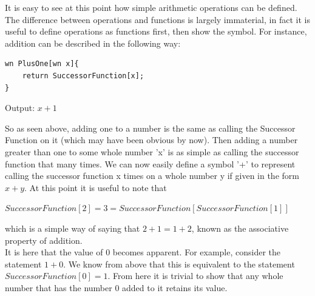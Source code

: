 It is easy to see at this point how simple arithmetic operations can be defined. The difference between operations and functions is largely immaterial, in fact it is useful to define operations as functions first, then show the symbol. For instance, addition can be described in the following way:
\begin{center}
\begin{verbatim}
wn PlusOne[wn x]{
	return SuccessorFunction[x];
}
\end{verbatim}
Output: $x+1$
\end{center}
So as seen above, adding one to a number is the same as calling the Successor Function on it (which may have been obvious by now). Then adding a number greater than one to some whole number 'x' is as simple as calling the successor function that many times. We can now easily define a symbol '+' to represent calling the successor function x times on a whole number y if given in the form $x+y$. At this point it is useful to note that
\begin{center}
$SuccessorFunction[2]=3=SuccessorFunction[SuccessorFunction[1]]$
\end{center}
which is a simple way of saying that $2+1=1+2$, known as the associative property of addition. \\
It is here that the value of $0$ becomes apparent. For example, consider the statement $1+0$. We know from above that this is equivalent to the statement \\ $SuccessorFunction[0]=1$. From here it is trivial to show that any whole number that has the number $0$ added to it retains its value.


